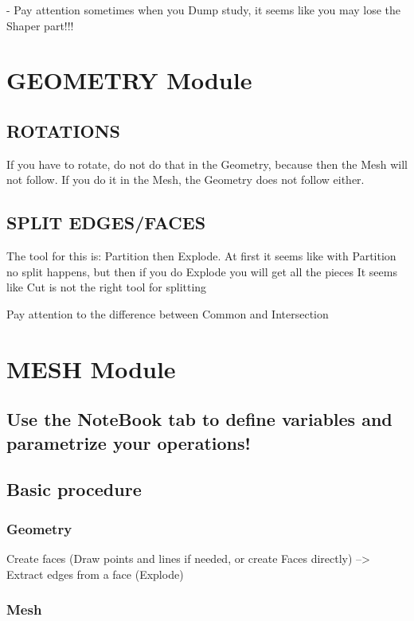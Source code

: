 \documentclass[10pt]{book}
\begin{document}
 - Pay attention sometimes when you Dump study, it seems like you may lose the Shaper part!!!  
   
 \chapter{GEOMETRY Module}
 
 \section{ROTATIONS}


If you have to rotate, do not do that in the Geometry, because then the Mesh will not follow.
If you do it in the Mesh, the Geometry does not follow either.

\section{SPLIT EDGES/FACES}


The tool for this is: Partition then Explode. At first it seems like with Partition no split happens, but then if you do Explode you will get all the pieces
It seems like Cut is not the right tool for splitting

Pay attention to the difference between Common and Intersection

 \chapter{MESH Module}

 
 \section{Use the NoteBook tab to define variables and parametrize your operations!}

 
 \section{Basic procedure}


\subsection{Geometry}


Create faces (Draw points and lines if needed, or create Faces directly)
   --> Extract edges from a face (Explode)
   
\subsection{Mesh}
 
\end{document}
